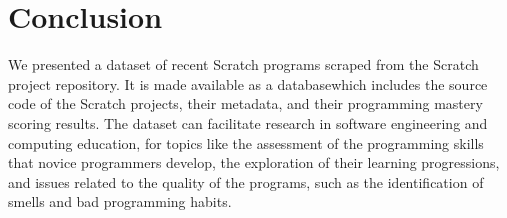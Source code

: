 \documentclass[10pt, conference]{IEEEtran}
\begin{document}
\section{Conclusion}
We presented a dataset of recent Scratch programs scraped from the Scratch project repository.
It is made available as a database\footnotemark[\ref{dataseturl}] which includes the source code of the Scratch projects, their metadata, and their programming mastery scoring results.
The dataset can facilitate research in software engineering and computing education, for topics like the assessment of the programming skills that novice programmers develop, the exploration of their learning progressions, and issues related to the quality of the programs, such as the identification of smells and bad programming habits.



\end{document}
